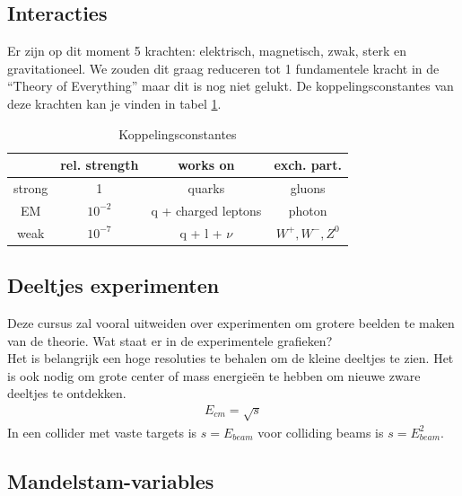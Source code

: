 \documentclass[../main.tex]{subfiles}
\begin{document}
\subsection{Interacties}%
\label{sub:interacties}

Er zijn op dit moment 5 krachten: elektrisch, magnetisch, zwak, sterk en gravitationeel. We zouden dit graag reduceren tot 1 fundamentele kracht in de ``Theory of Everything'' maar dit is nog niet gelukt. De koppelingsconstantes van deze krachten kan je vinden in tabel \ref{tab:coupling_constants}.
\begin{table}[h]
    \centering
    \caption{Koppelingsconstantes}
    \label{tab:coupling_constants}
    \begin{tabular}{cccc}
                & rel. strength & works on              & exch. part. \\
        \hline
        strong  & 1             & quarks                & gluons \\
        EM      & $10^{-2}$     & q + charged leptons   & photon \\
        weak    & $10^{-7}$     & q + l + $\nu$         & $W^+,W^-,Z^0$
    \end{tabular}
\end{table}

\subsection{Deeltjes experimenten}%
\label{sub:deeltjes_experimenten}

Deze cursus zal vooral uitweiden over experimenten om grotere beelden te maken van de theorie. Wat staat er in de experimentele grafieken?\\
Het is belangrijk een hoge resoluties te behalen om de kleine deeltjes te zien. Het is ook nodig om grote center of mass energieën te hebben om nieuwe zware deeltjes te ontdekken.
\begin{equation}
    \begin{aligned}
        \label{eq:E_cm}
        E_{cm} = \sqrt{s}
    \end{aligned}
\end{equation}
In een collider met vaste targets is $s=E_{beam}$ voor colliding beams is $s=E_{beam}^2$.

\subsection{Mandelstam-variables}%
\label{sub:mandelstam_variables}
\end{document}

